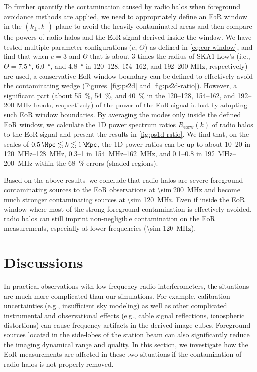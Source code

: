 \documentclass[modern]{aastex62}
\newcommand{\R}[1]{\mathrm{#1}}
\newcommand{\klos}{\text{$k_{\parallel}$}}
\newcommand{\kperp}{\text{$k_{\bot}$}}
\newcommand{\fov}{\text{Fo\!V}}
\begin{document}
To further quantify the contamination caused by radio halos when
foreground avoidance methods are applied, we need to appropriately
define an EoR window in the $(\kperp, \klos)$ plane to avoid the
heavily contaminated areas and then compare the powers of radio halos
and the EoR signal derived inside the window.
We have tested multiple parameter configurations ($e$, $\Theta$) as
defined in \autoref{eq:eor-window}, and find that when $e = 3$ and
$\Theta$ that is about 3 times the radius of SKA1-Low's \fov{} (i.e.,
$\Theta = \SI{7.5}{\degree}$, \SI{6.0}{\degree}, and \SI{4.8}{\degree}
in \numrange{120}{128}, \numrange{154}{162}, and \numrange{192}{200}
\si{\MHz}, respectively) are used, a conservative EoR window boundary
can be defined to effectively avoid the contaminating wedge
(Figures~\ref{fig:ps2d} and \ref{fig:ps2d-ratio}).
However, a significant part (about \SI{55}{\percent}, \SI{54}{\percent},
and \SI{40}{\percent} in the \numrange{120}{128}, \numrange{154}{162},
and \numrange{192}{200} \si{\MHz} bands, respectively) of the power of
the EoR signal is lost by adopting such EoR window boundaries.
By averaging the modes only inside the defined EoR window, we calculate
the 1D power spectrum ratios $R_{\R{eorw}}(k)$ of radio halos to the EoR
signal and present the results in \autoref{fig:ps1d-ratio}.
We find that, on the scales of
$\SI{0.5}{\per\Mpc} \lesssim k \lesssim \SI{1}{\per\Mpc}$,
the 1D power ratios can be up to about
\numrange{10}{20} in \SIrange{120}{128}{\MHz},
\numrange{0.3}{1} in \SIrange{154}{162}{\MHz}, and
\numrange{0.1}{0.8} in \SIrange{192}{200}{\MHz}
within the \SI{68}{\percent} errors (shaded regions).

Based on the above results, we conclude that radio halos are severe
foreground contaminating sources to the EoR observations at
\SI{\sim 200}{\MHz} and become much stronger contaminating sources at
\SI{\sim 120}{\MHz}.
Even if inside the EoR window where most of the strong foreground
contamination is effectively avoided, radio halos can still imprint
non-negligible contamination on the EoR measurements, especially at
lower frequencies (\SI{\sim 120}{\MHz}).


\section{Discussions}
\label{sec:discussions}

In practical observations with low-frequency radio interferometers, the
situations are much more complicated than our simulations.
For example, calibration uncertainties (e.g., insufficient sky modeling)
as well as other complicated instrumental and observational effects
(e.g., cable signal reflections, ionospheric distortions) can cause
frequency artifacts in the derived image cubes.
Foreground sources located in the side-lobes of the station beam can
also significantly reduce the imaging dynamical range and quality.
In this section, we investigate how the EoR measurements are affected
in these two situations if the contamination of radio halos is not
properly removed.
\end{document}
